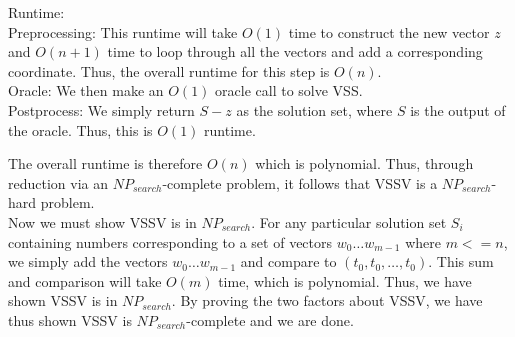 \documentclass[11pt]{article}
\begin{document}
\begin{enumerate}
    Runtime: \\
    
    Preprocessing: This runtime will take $O(1)$ time to construct the new vector $z$ and $O(n+1)$ time to loop through all the vectors and add a corresponding coordinate. Thus, the overall runtime for this step is $O(n)$. \\
    
    Oracle: We then make an $O(1)$ oracle call to solve VSS. \\
    
    Postprocess: We simply return $S - z$ as the solution set, where $S$ is the output of the oracle. Thus, this is $O(1)$ runtime. 
    
    The overall runtime is therefore $O(n)$ which is polynomial. Thus, through reduction via an $NP_{search}$-complete problem, it follows that VSSV is a $NP_{search}$-hard problem. \\
    
    Now we must show VSSV is in $NP_{search}$. For any particular solution set $S_i$ containing numbers corresponding to a set of vectors $w_0 \dots w_{m-1}$ where $m<=n$, we simply add the vectors $w_0 \dots w_{m-1}$ and compare to $(t_0, t_0, \dots, t_0)$. This sum and comparison will take $O(m)$ time, which is polynomial. Thus, we have shown VSSV is in $NP_{search}$. By proving the two factors about VSSV, we have thus shown VSSV is $NP_{search}$-complete and we are done. 
    \end{enumerate}
\end{document}
